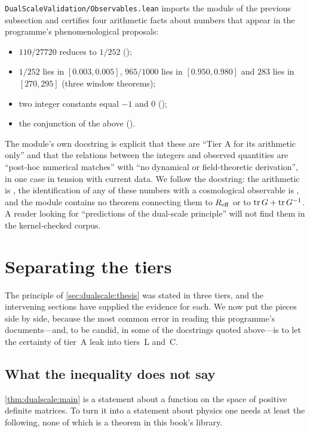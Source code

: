 \texttt{DualScaleValidation/Observables.lean} imports the module of the previous subsection and
certifies four arithmetic facts about numbers that appear in the programme's phenomenological
proposals:
\begin{itemize}[leftmargin=*,nosep]
\item $110/27720$ reduces to $1/252$ ();
\item $1/252$ lies in $[0.003,0.005]$, $965/1000$ lies in $[0.950,0.980]$ and $283$ lies in
 $[270,295]$ (three window theorems);
\item two integer constants equal $-1$ and $0$ ();
\item the conjunction of the above ().
\end{itemize}
The module's own docstring is explicit that these are ``Tier A for its arithmetic only'' and that the relations
between the integers and observed quantities are ``post-hoc numerical matches'' with ``no
dynamical or field-theoretic derivation'', in one case in tension with current data. We follow
the docstring: the arithmetic is \TA, the identification of any of these numbers with a
cosmological observable is \TC, and the module contains no theorem connecting them to
$R_{\rm eff}$ or to $\operatorname{tr} G+\operatorname{tr} G^{-1}$. A reader looking for ``predictions of the dual-scale
principle'' will not find them in the kernel-checked corpus.

\section{Separating the tiers}\label{sec:dualscale:tiers}

The principle of \cref{sec:dualscale:thesis} was stated in three tiers, and the intervening
sections have supplied the evidence for each. We now put the pieces side by side, because the
most common error in reading this programme's documents---and, to be candid, in some of the
docstrings quoted above---is to let the certainty of tier~A leak into tiers~L and~C.

\subsection{What the inequality does not say}

\cref{thm:dualscale:main} is a statement about a function on the space of positive definite
matrices. To turn it into a statement about physics one needs at least the following, none of
which is a theorem in this book's library.

